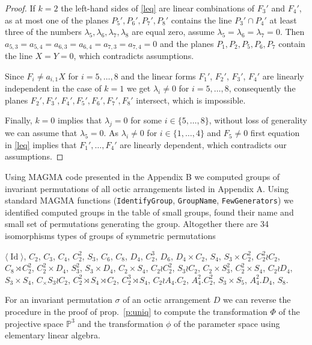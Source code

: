 \documentclass[12pt]{amsart}
\theoremstyle{plain}
\theoremstyle{remark}
\theoremstyle{definition}
\newcommand{\PP}{\mathbb P}
\numberwithin{table}{section}
\begin{document}
\begin{proof}
  If $k=2$ the left-hand sides of \eqref{leq} are linear combinations of $F_{3}'$ and $F_{4}'$, as at most one of the planes $P_{5}', P_{6}', P_{7}', P_{8}'$
contains the line $P_{3}'\cap P_{4}'$ at least three of the numbers $\lambda_{5}, \lambda_{6}, \lambda_{7}, \lambda_{8} $ are equal zero, assume $\lambda_{5} = \lambda_{6} = \lambda_{7}=0$. Then $a_{5,3} = a_{5,4} = a_{6,3} = a_{6,4} = a_{7,3} = a_{7,4}=0$ and the planes $P_{1}, P_{2}, P_{5}, P_{6}, P_{7}$ contain the line $X=Y=0$, which contradicts assumptions.

Since $F_{i}\not=a_{i,1}X$ for $i=5,\dots,8$ and the linear forms $F_{1}'$, $F_{2}'$, $F_{3}'$, $F_{4}'$ are linearly independent
in the case of $k=1$  we get $\lambda_{i}\not=0$ for $i=5,\dots,8$, consequently the planes $F_{2}', F_{3}', F_{4}', F_{5}', F_{6}', F_{7}', F_{8}'$ intersect, which is impossible.

Finally, $k=0$ implies that $\lambda_{j}=0$ for some $i\in\{5,\dots,8\}$, without loss of generality we can assume that $\lambda_{5}=0$. As $\lambda_{i}\not=0$ for $i\in\{1,\dots,4\}$ and $F_{5}\not=0$ first equation in \eqref{leq} implies that $F_{1}',\dots,F_{4}'$ are linearly dependent, which contradicts our assumptions.
\end{proof}


Using MAGMA code presented in the Appendix B we computed groups of invariant permutations of all octic arrangements listed in Appendix A. Using standard MAGMA functions (\texttt{IdentifyGroup}, \texttt{GroupName}, \texttt{FewGenerators}) we identified computed groups in the table of small groups, found their name and small set of permutations generating the group.
Altogether there are 34 isomorphisms types of groups of symmetric permutations

\noindent
 $\langle\operatorname{Id}\rangle$,
 $C_2$,
 $C_3$,
 $C_4$,
 $C_2^2$,
 $S_3$,
 $C_6$,
 $C_8$,
 $D_4$,
 $C_2^3$,
 $D_6$,
 $D_4\times C_2$,
 $S_4$,
 $S_3\times C_2^2$,
 $C_2^2\wr C_2$,
 $C_8\rtimes C_2^2$,
 $C_2^2\times D_4$,
 $S_3^2$,
 $S_3\times D_4$,
 $C_2\times S_4$,
 $C_2\wr C_2^2$,
 $S_3\wr C_2$,
 $C_2\times S_3^2$,
 $C_2^2\times S_4$,
 $C_2\wr D_4$,
 $S_3\times S_4$,
 $C_\times S_3\wr C_2$,
 $C_2^2\rtimes S_4\rtimes C_2$,
 $C_2^3\rtimes S_4$,
 $C_2\wr A_4.C_2$,
 $A_4^2.C_2^2$,
 $S_3\times S_5$,
 $A_4^2.D_4$,
 $S_8$.

For an invariant permutation $\sigma$ of an octic arrangement $D$ we can reverse the procedure in the proof of prop.~\ref{p:uniq} to compute the transformation $\Phi$ of the projective space $\PP^{3}$ and the transformation $\phi$ of the parameter space using  elementary linear algebra.
\end{document}
